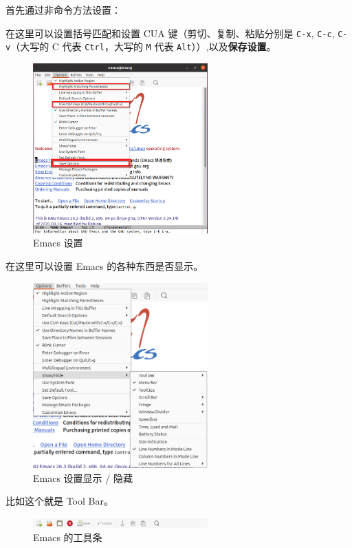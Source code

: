 \documentclass[UTF-8]{ctexart}
\begin{document}
				首先通过非命令方法设置：
				
				在这里可以设置括号匹配和设置 CUA 键（剪切、复制、粘贴分别是 \texttt{C-x}, \texttt{C-c}, \texttt{C-v}（大写的 C 代表 \texttt{Ctrl}，大写的 \texttt{M} 代表 \texttt{Alt}））,以及\textbf{\large 保存设置}。
				
				\begin{figure}[H]
					\centering
					\includegraphics[width=0.6\textwidth]{fig/emacs_options.png}
					\caption*{Emacs 设置}
				\end{figure}
			
				在这里可以设置 Emacs 的各种东西是否显示。
				
				\begin{figure}[H]
					\centering
					\includegraphics[width=0.6\textwidth]{fig/emacs_show_hide.png}
					\caption*{Emacs 设置显示 / 隐藏}
				\end{figure}
			
				比如这个就是 Tool Bar。
				
				\begin{figure}[H]
					\centering
					\includegraphics[width=0.6\textwidth]{fig/emacs_toolbar.png}
					\caption*{Emacs 的工具条}
				\end{figure}
			
\end{document}
